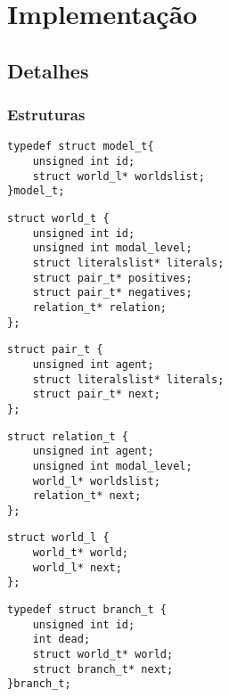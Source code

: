 \chapter{Implementação}

\section{Detalhes}
\subsection{Estruturas}
\label{subsec:estruturas}


\begin{lstlisting}[frame=single]
typedef struct model_t{ 
    unsigned int id;
    struct world_l* worldslist;
}model_t;
\end{lstlisting}

\begin{lstlisting}[frame=single]
struct world_t {
    unsigned int id;
    unsigned int modal_level;
    struct literalslist* literals;
    struct pair_t* positives;
    struct pair_t* negatives;
    relation_t* relation;
};
\end{lstlisting}

\begin{lstlisting}[frame=single]
struct pair_t {
    unsigned int agent;
    struct literalslist* literals;
    struct pair_t* next;
};
\end{lstlisting}

\begin{lstlisting}[frame=single]
struct relation_t {
    unsigned int agent;
    unsigned int modal_level;
    world_l* worldslist;
    relation_t* next;
};
\end{lstlisting}

\begin{lstlisting}[frame=single]
struct world_l {
    world_t* world;
    world_l* next;
};
\end{lstlisting}

\begin{lstlisting}[frame=single]
typedef struct branch_t {
    unsigned int id;
    int dead;
    struct world_t* world;
    struct branch_t* next;
}branch_t;
\end{lstlisting}
